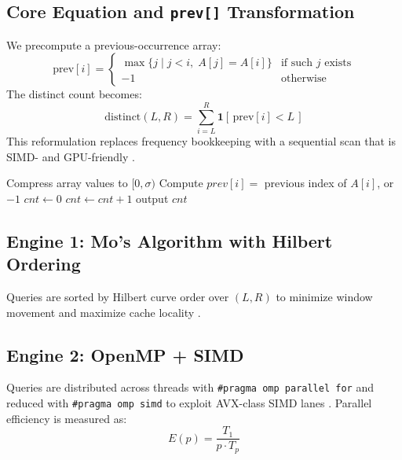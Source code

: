 \documentclass[12pt,a4paper]{article}
\begin{document}
	\subsection{Core Equation and \texttt{prev[]} Transformation}
	We precompute a previous-occurrence array:
	\begin{equation}
		\text{prev}[i] =
		\begin{cases}
			\max\{j \mid j < i,\; A[j] = A[i]\} & \text{if such } j \text{ exists} \\
			-1 & \text{otherwise}
		\end{cases}
	\end{equation}
	The distinct count becomes:
	\begin{equation}
		\text{distinct}(L,R) = \sum_{i=L}^{R} \mathbf{1}[\,\text{prev}[i] < L\,]
	\end{equation}
	This reformulation replaces frequency bookkeeping with a sequential scan that is SIMD- and GPU-friendly \cite{deng2019offline}.
	
	\begin{algorithm}
		\caption{Prev-Array Distinct Counting (CPU/GPU core)}
		\begin{algorithmic}[1]
			\State Compress array values to $[0,\sigma)$
			\State Compute $prev[i] =$ previous index of $A[i]$, or $-1$
				\State $cnt \leftarrow 0$
						\State $cnt \leftarrow cnt + 1$
					\EndIf
				\EndFor
				\State output $cnt$
			\EndFor
		\end{algorithmic}
	\end{algorithm}
	
	\subsection{Engine 1: Mo's Algorithm with Hilbert Ordering}
	Queries are sorted by Hilbert curve order over $(L,R)$ to minimize window movement and maximize cache locality \cite{mo1974,hilbert1891,moon2001,haverkort2011}.
	
	\subsection{Engine 2: OpenMP + SIMD}
	Queries are distributed across threads with \texttt{\#pragma omp parallel for} and reduced with \texttt{\#pragma omp simd} to exploit AVX-class SIMD lanes \cite{dagum1998openmp,openmp2018,intel2023avx,kruse2021vectorization}. Parallel efficiency is measured as:
	\begin{equation}
		E(p) = \frac{T_1}{p \cdot T_p}
	\end{equation}
	
\end{document}
